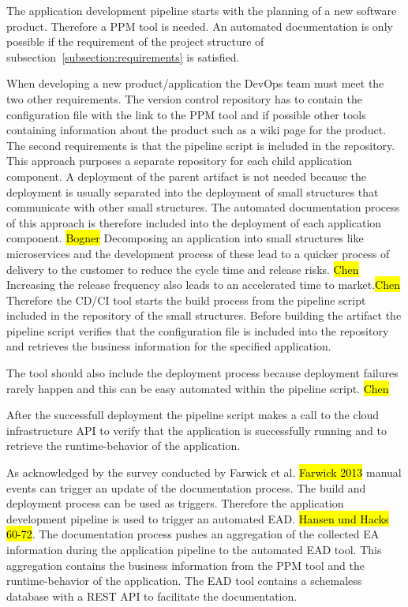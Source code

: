 The application development pipeline starts with the planning of a new software product. Therefore a PPM tool is needed. An automated documentation is only possible if the requirement of the project structure of subsection~\ref{subsection:requirements} is satisfied. 

When developing a new product/application the DevOps team must meet the two other requirements. The version control repository has to contain the configuration file with the link to the PPM tool and if possible other tools containing information about the product such as a wiki page for the product. The second requirements is that the pipeline script is included in the repository. 
This approach purposes a separate repository for each child application component. 
A deployment of the parent artifact is not needed because the deployment is usually separated into the deployment of small structures that communicate with other small structures. The automated documentation process of this approach is therefore included into the deployment of each application component. \hl{Bogner} 
Decomposing an application into small structures like microservices and the development process of these lead to a quicker process of delivery to the customer to reduce the cycle time and release risks. \hl{Chen} Increasing the release frequency also leads to an accelerated time to market.\hl{Chen} Therefore the CD/CI tool starts the build process from the pipeline script included in the repository of the small structures.
Before building the artifact the pipeline script verifies that the configuration file is included into the repository and retrieves the business information for the specified application.

The tool should also include the deployment process because deployment failures rarely happen and this can be easy automated  within the pipeline script. \hl{Chen}

After the successfull deployment the pipeline script makes a call to the cloud infrastructure API to verify that the application is successfully running and to retrieve the runtime-behavior of the application.

As acknowledged by the survey conducted by Farwick et al. \hl{Farwick 2013} manual events can trigger an update of the documentation process. The build and deployment process can be used as triggers. Therefore the application development pipeline is used to trigger an automated EAD. \hl{Hansen und Hacks 60-72}. The documentation process pushes an aggregation of the collected EA information during the application pipeline to the automated EAD tool. This aggregation contains the business information from the PPM tool and the runtime-behavior of the application. The EAD tool contains a schemaless database with a REST API to facilitate the documentation. 

